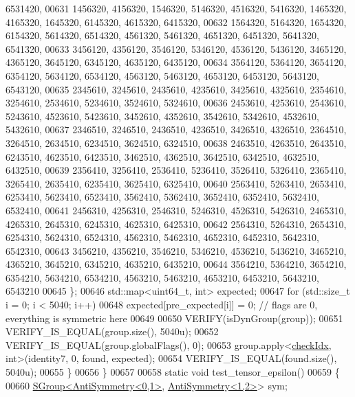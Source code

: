 \begin{DoxyCode}
      6531420,
00631       1456320, 4156320, 1546320, 5146320, 4516320, 5416320, 1465320, 4165320, 1645320, 6145320, 4615320, 
      6415320,
00632       1564320, 5164320, 1654320, 6154320, 5614320, 6514320, 4561320, 5461320, 4651320, 6451320, 5641320, 
      6541320,
00633       3456120, 4356120, 3546120, 5346120, 4536120, 5436120, 3465120, 4365120, 3645120, 6345120, 4635120, 
      6435120,
00634       3564120, 5364120, 3654120, 6354120, 5634120, 6534120, 4563120, 5463120, 4653120, 6453120, 5643120, 
      6543120,
00635       2345610, 3245610, 2435610, 4235610, 3425610, 4325610, 2354610, 3254610, 2534610, 5234610, 3524610, 
      5324610,
00636       2453610, 4253610, 2543610, 5243610, 4523610, 5423610, 3452610, 4352610, 3542610, 5342610, 4532610, 
      5432610,
00637       2346510, 3246510, 2436510, 4236510, 3426510, 4326510, 2364510, 3264510, 2634510, 6234510, 3624510, 
      6324510,
00638       2463510, 4263510, 2643510, 6243510, 4623510, 6423510, 3462510, 4362510, 3642510, 6342510, 4632510, 
      6432510,
00639       2356410, 3256410, 2536410, 5236410, 3526410, 5326410, 2365410, 3265410, 2635410, 6235410, 3625410, 
      6325410,
00640       2563410, 5263410, 2653410, 6253410, 5623410, 6523410, 3562410, 5362410, 3652410, 6352410, 5632410, 
      6532410,
00641       2456310, 4256310, 2546310, 5246310, 4526310, 5426310, 2465310, 4265310, 2645310, 6245310, 4625310, 
      6425310,
00642       2564310, 5264310, 2654310, 6254310, 5624310, 6524310, 4562310, 5462310, 4652310, 6452310, 5642310, 
      6542310,
00643       3456210, 4356210, 3546210, 5346210, 4536210, 5436210, 3465210, 4365210, 3645210, 6345210, 4635210, 
      6435210,
00644       3564210, 5364210, 3654210, 6354210, 5634210, 6534210, 4563210, 5463210, 4653210, 6453210, 5643210, 
      6543210
00645     \};
00646     std::map<uint64\_t, int> expected;
00647     \textcolor{keywordflow}{for} (std::size\_t i = 0; i < 5040; i++)
00648       expected[pre\_expected[i]] = 0; \textcolor{comment}{// flags are 0, everything is symmetric here}
00649 
00650     VERIFY(isDynGroup(group));
00651     VERIFY\_IS\_EQUAL(group.size(), 5040u);
00652     VERIFY\_IS\_EQUAL(group.globalFlags(), 0);
00653     group.apply<\hyperlink{structcheck_idx}{checkIdx}, \textcolor{keywordtype}{int}>(identity7, 0, found, expected);
00654     VERIFY\_IS\_EQUAL(found.size(), 5040u);
00655   \}
00656 \}
00657 
00658 \textcolor{keyword}{static} \textcolor{keywordtype}{void} test\_tensor\_epsilon()
00659 \{
00660   \hyperlink{class_eigen_1_1_s_group}{SGroup<AntiSymmetry<0,1>}, \hyperlink{struct_eigen_1_1_anti_symmetry}{AntiSymmetry<1,2>}> sym;

\end{DoxyCode}
